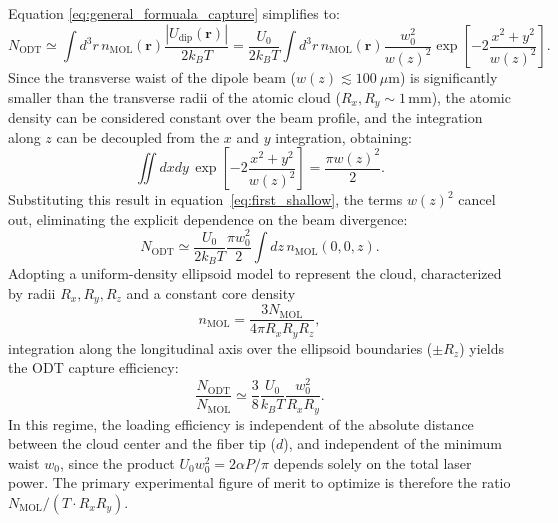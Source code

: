 Equation \eqref{eq:general_formuala_capture} simplifies to:
\begin{equation}
    \label{eq:first_shallow}
    N_{\text{ODT}} \simeq \int d^3r \, n_{\text{MOL}}(\mathbf{r}) \frac{|U_{\text{dip}}(\mathbf{r})|}{2k_B T} = \frac{U_0}{2k_B T} \int d^3r \, n_{\text{MOL}}(\mathbf{r}) \frac{w_0^2}{w(z)^2} \exp\left[ -2\frac{x^2+y^2}{w(z)^2} \right].
\end{equation}
Since the transverse waist of the dipole beam ($w(z) \lesssim 100~\mu\text{m}$) is significantly smaller than the transverse radii of the atomic cloud ($R_x, R_y \sim 1\,\text{mm}$), the atomic density can be considered constant over the beam profile, and the integration along $z$ can be decoupled from the $x$ and $y$ integration, obtaining:
\begin{equation}
    \iint dx dy \, \exp\left[ -2\frac{x^2+y^2}{w(z)^2} \right] = \frac{\pi w(z)^2}{2}.
\end{equation}
Substituting this result in equation~\eqref{eq:first_shallow}, the terms $w(z)^2$ cancel out, eliminating the explicit dependence on the beam divergence:
\begin{equation}
    N_{\text{ODT}} \simeq \frac{U_0}{2k_B T} \frac{\pi w_0^2}{2} \int dz \, n_{\text{MOL}}(0,0,z).
\end{equation}
Adopting a uniform-density ellipsoid model to represent the cloud, characterized by radii $R_x, R_y, R_z$ and a constant core density
\begin{equation}
    n_{\text{MOL}} = \frac{3N_{\text{MOL}}}{4\pi R_x R_y R_z},
\end{equation}
integration along the longitudinal axis over the ellipsoid boundaries ($\pm R_z$) yields the ODT capture efficiency:
\begin{equation}
    \frac{N_{\text{ODT}}}{N_{\text{MOL}}} \simeq \frac{3}{8} \frac{U_0}{k_B T} \frac{w_0^2}{R_x R_y}.
\label{eq:shallow_efficiency}
\end{equation}
In this regime, the loading efficiency is independent of the absolute distance between the cloud center and the fiber tip ($d$), and independent of the minimum waist $w_0$, since the product $U_0 w_0^2 = 2\alpha P / \pi$ depends solely on the total laser power. The primary experimental figure of merit to optimize is therefore the ratio $N_{\text{MOL}}/(T \cdot R_x R_y)$.

